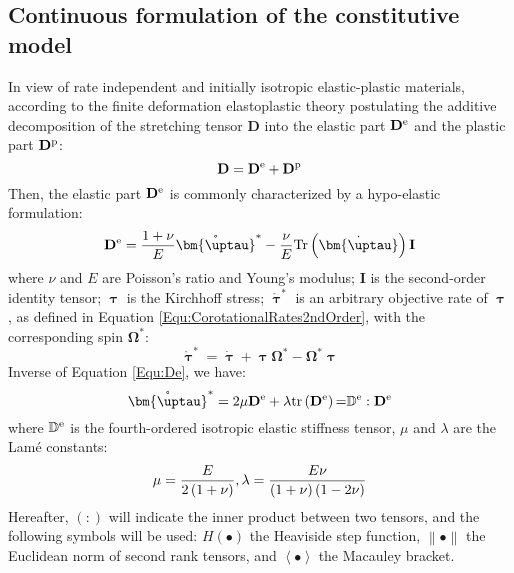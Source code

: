 \subsection{Continuous formulation of the constitutive model}
\noindent
In view of rate independent and initially isotropic elastic-plastic materials, according to the finite deformation elastoplastic theory postulating the additive decomposition of the stretching tensor ${\mathbf{D}}$ into the elastic part ${{\mathbf{D}}^{\rm{e}}}$ and the plastic part ${{\mathbf{D}}^{\rm{p}}}$:
\begin{equation}
{\mathbf{D}} = {{\mathbf{D}}^{\rm{e}}} + {{\mathbf{D}}^{\rm{p}}}
\end{equation}
Then, the elastic part ${{\mathbf{D}}^{\rm{e}}}$ is commonly characterized by a hypo-elastic formulation:
\begin{equation}
\label{Equ:De}
{{\mathbf{D}}^{\rm{e}}} = \frac{{1 + \nu }}{E}{\mathring {\bm{\uptau }}^{*}} - \frac{\nu }{E}{\rm{Tr}}\left( {\dot {\bm{\uptau }}} \right){\mathbf{I}}
\end{equation}
where $\nu$ and $E$ are Poisson's ratio and Young's modulus; ${\mathbf{I}}$ is the second-order identity tensor; $\bm{\uptau}$ is the Kirchhoff stress; ${\mathring {\bm{\uptau }}^{*}}$ is an arbitrary objective rate of $\bm{\uptau}$, as defined in Equation \ref{Equ:CorotationalRates2ndOrder}, with the corresponding spin ${{\mathbf{\Omega }}^*}$:
\begin{equation}
{\mathring {\bm{\uptau }}^{*}} = \dot {\bm{\uptau }}  + \bm{\uptau } {{\mathbf{\Omega }}^*} - {{\mathbf{\Omega }}^*}\bm{\uptau }
\end{equation}
Inverse of Equation \ref{Equ:De}, we have:
\begin{equation}
{\mathring {\bm{\uptau }}^{*}} = 2\mu {{\mathbf{D}}^{\rm{e}}} + \lambda {\rm{tr}}\left( {{{\mathbf{D}}^{\rm{e}}}} \right){\rm{ = }}{\mathbb{D}^{\rm{e}}}:{{\mathbf{D}}^{\rm{e}}}
\end{equation}
where ${\mathbb{D}}^{\rm{e}}$ is the fourth-ordered isotropic elastic stiffness tensor, $\mu$ and $\lambda$ are the Lam\'{e} constants:
\begin{equation}
\mu  = \frac{E}{{2\left( {1 + \nu } \right)}},{\rm{  }}\lambda  = \frac{{E\nu }}{{\left( {1 + \nu } \right)\left( {1 - 2\nu } \right)}}
\end{equation}
Hereafter, $\left(:\right)$ will indicate the inner product between two tensors, and the following symbols will be used: $H\left(\bullet\right)$ the Heaviside step function, $\left\|\bullet\right\|$ the Euclidean norm of second rank tensors, and $\left<\bullet\right>$ the Macauley bracket.\\
